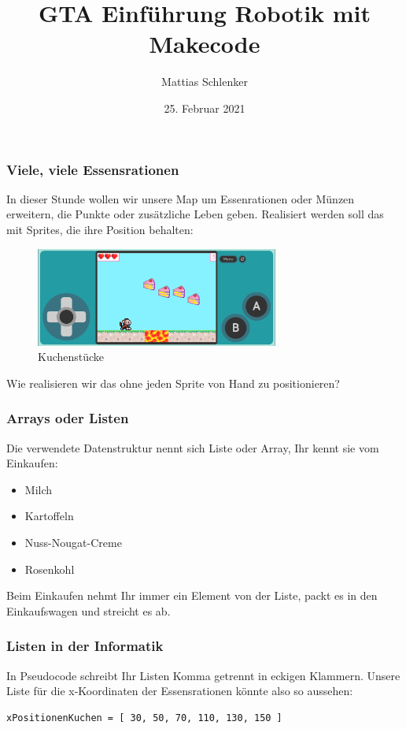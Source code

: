 \documentclass{beamer}
\title{GTA Einführung Robotik mit Makecode}
\author{Mattias Schlenker}
\institute{Wilhelm-Ostwald-Gymnasium}
\date{25. Februar 2021}
\begin{document}
\frame{\titlepage}

\begin{frame}
\frametitle{Viele, viele Essensrationen}
 
In dieser Stunde wollen wir unsere Map um Essenrationen oder Münzen erweitern, die Punkte oder zusätzliche Leben geben. Realisiert werden soll das mit Sprites, die ihre Position behalten:

 \begin{figure}
  \includegraphics[width=8cm]{game38.png}
  \caption{Kuchenstücke}
  \label{fig:game38}
\end{figure}

Wie realisieren wir das ohne jeden Sprite von Hand zu positionieren? 

\end{frame}

\begin{frame}
 \frametitle{Arrays oder Listen}
 
Die verwendete Datenstruktur nennt sich Liste oder Array, Ihr kennt sie vom Einkaufen:

\begin{itemize}
\item Milch
\item Kartoffeln
\item Nuss-Nougat-Creme
\item Rosenkohl
\end{itemize}

Beim Einkaufen nehmt Ihr immer ein Element von der Liste, packt es in den Einkaufswagen und streicht es ab.
 
\end{frame}

\begin{frame}[fragile]
 \frametitle{Listen in der Informatik}
 
In Pseudocode schreibt Ihr Listen Komma getrennt in eckigen Klammern. Unsere Liste für die x-Koordinaten der Essensrationen könnte also so aussehen:

\begin{verbatim}xPositionenKuchen = [ 30, 50, 70, 110, 130, 150 ] \end{verbatim}
 
\end{frame}
\end{document}
